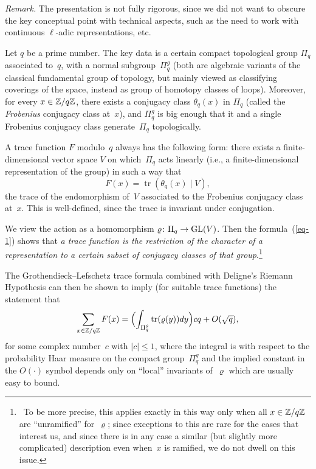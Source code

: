 \documentclass[oneside,11pt]{amsart}
\DeclareMathOperator{\Tr}{tr}
\renewcommand{\rho}{\varrho}
\begin{document}
\emph{Remark.}
  The presentation is not fully rigorous, since we did not want to
  obscure the key conceptual point with technical aspects, such as the
  need to work with continuous $\ell$-adic representations, etc.
 

Let $q$ be a prime number. The key data is a certain compact
topological group $\Pi_q$ associated to~$q$, with a normal
subgroup~$\Pi_q^g$ (both are algebraic variants of the classical
fundamental group of topology, but mainly viewed as classifying
coverings of the space, instead as group of homotopy classes of
loops). Moreover, for every $x\in\mathbb{Z}/q\mathbb{Z}$, there exists a conjugacy
class $\theta_{q}(x)$ in $\Pi_q$ (called the \emph{Frobenius}
conjugacy class at~$x$), and $\Pi_q^g$ is big enough that it and a
single Frobenius conjugacy class generate~$\Pi_q$ topologically.


A trace function $F$ modulo~$q$ always has the
following form: there exists a finite-dimensional vector space $V$ on
which~$\Pi_q$ acts linearly (i.e., a finite-dimensional representation
of the group) in such a way that
\begin{equation}\label{eq-1}
  F(x)=\Tr(\theta_{q}(x)\mid V),
\end{equation}
the trace of the endomorphism of~$V$ associated to the Frobenius
conjugacy class at~$x$. This is well-defined, since the trace is
invariant under conjugation.

We view the action as a homomorphism $\rho\colon\Pi_q\to \GL(V)$. Then
the formula~(\ref{eq-1}) shows that \emph{a trace function is the
  restriction of the character of a representation to a certain subset
  of conjugacy classes of that group}.\footnote{\ To be more precise, this
  applies exactly in this way only when all $x\in\mathbb{Z}/q\mathbb{Z}$ are
  ``unramified'' for~$\rho$; since exceptions to this are rare for the
  cases that interest us, and since there is in any case a similar
  (but slightly more complicated) description even when~$x$ is
  ramified, we do not dwell on this issue.}

The Grothendieck--Lefschetz trace formula combined with Deligne's
Riemann Hypothesis can then be shown to imply (for suitable trace
functions) the statement that
\begin{equation}\label{eq-deligne}
  \sum_{x\in \Z/q\Z}
  F(x)=\Bigl(\int_{\Pi_q^g}\Tr(\rho(y))dy\Bigr)cq+O(\sqrt{q}),
\end{equation}
for some complex number~$c$ with $|c|\leq 1$, where the integral is
with respect to the probability Haar measure on the compact
group~$\Pi_q^g$ and the implied constant in the $O(\cdot)$ symbol
depends only on ``local'' invariants of~$\rho$ which are usually easy
to bound.
\end{document}
